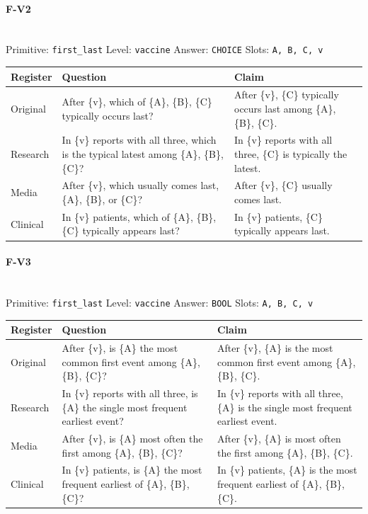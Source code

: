 \documentclass[11pt]{article}
\begin{document}
\paragraph{\textbf{F-V2}}\mbox{}\\
Primitive: \texttt{first\_last} \quad Level: \texttt{vaccine} \quad Answer: \texttt{CHOICE} \quad Slots: \texttt{A, B, C, v}\\[2pt]
\begin{tabularx}{\linewidth}{@{}l L L@{}}
\toprule
\textbf{Register} & \textbf{Question} & \textbf{Claim} \\
\midrule
Original & After \{v\}, which of \{A\}, \{B\}, \{C\} typically occurs last? & After \{v\}, \{C\} typically occurs last among \{A\}, \{B\}, \{C\}. \\
Research & In \{v\} reports with all three, which is the typical latest among \{A\}, \{B\}, \{C\}? & In \{v\} reports with all three, \{C\} is typically the latest. \\
Media & After \{v\}, which usually comes last, \{A\}, \{B\}, or \{C\}? & After \{v\}, \{C\} usually comes last. \\
Clinical & In \{v\} patients, which of \{A\}, \{B\}, \{C\} typically appears last? & In \{v\} patients, \{C\} typically appears last. \\
\bottomrule
\end{tabularx}
\vspace{4pt}

\paragraph{\textbf{F-V3}}\mbox{}\\
Primitive: \texttt{first\_last} \quad Level: \texttt{vaccine} \quad Answer: \texttt{BOOL} \quad Slots: \texttt{A, B, C, v}\\[2pt]
\begin{tabularx}{\linewidth}{@{}l L L@{}}
\toprule
\textbf{Register} & \textbf{Question} & \textbf{Claim} \\
\midrule
Original & After \{v\}, is \{A\} the most common first event among \{A\}, \{B\}, \{C\}? & After \{v\}, \{A\} is the most common first event among \{A\}, \{B\}, \{C\}. \\
Research & In \{v\} reports with all three, is \{A\} the single most frequent earliest event? & In \{v\} reports with all three, \{A\} is the single most frequent earliest event. \\
Media & After \{v\}, is \{A\} most often the first among \{A\}, \{B\}, \{C\}? & After \{v\}, \{A\} is most often the first among \{A\}, \{B\}, \{C\}. \\
Clinical & In \{v\} patients, is \{A\} the most frequent earliest of \{A\}, \{B\}, \{C\}? & In \{v\} patients, \{A\} is the most frequent earliest of \{A\}, \{B\}, \{C\}. \\
\bottomrule
\end{tabularx}
\vspace{4pt}
\end{document}
